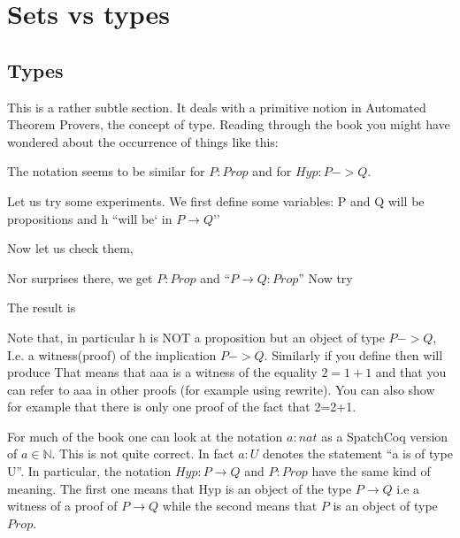 \chapter{Sets vs types}\label{chap:setsvstypes}
\cite{Nederpelt:2014aa}
\cite{Girard:1989aa}
\section{Types}\label{sec:types}
This is a rather subtle section. It deals with a primitive notion in Automated Theorem Provers, the concept of type. Reading through the book you might have wondered about the occurrence of things like this:


The notation seems to be similar for $P:Prop$ and for $Hyp:P->Q$.

Let us try some experiments. We first define some variables: P and Q will be propositions and h ``will be` in $P\rightarrow Q$''


Now let us check them, 

Nor surprises there, we get $P:Prop$ and ``$P \rightarrow Q : Prop$''
Now try

The result is 
     
Note that, in particular h is NOT a proposition but an object of type $P->Q$, I.e. a witness(proof) of the implication $P->Q$. Similarly if you define 
then  will produce
That means that aaa is a witness of the equality $2=1+1$ and that you can refer to aaa in other proofs (for example using rewrite). You can also show for example that there is only one proof of the fact that 2=2+1.




 For much of the book one can look at the notation $a:nat$ as a SpatchCoq version of $a\in \mathbb{N}$. This is not quite correct. In fact $a:U$ denotes the statement ``a is of type U''. In particular, the notation $Hyp:P\rightarrow Q$ and $P:Prop$ have the same kind of meaning. The first one means that Hyp is an object of the type $P\rightarrow Q$ i.e a witness of a proof of $P\rightarrow Q$ while the second means that $P$ is an object of type $Prop$.

